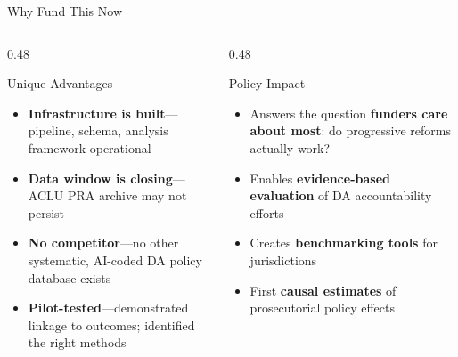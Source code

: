 \documentclass[aspectratio=169, 11pt]{beamer}
\begin{document}
\begin{frame}{Why Fund This Now}
\begin{columns}[T]
\begin{column}{0.48\textwidth}
\begin{block}{Unique Advantages}
\begin{itemize}\setlength\itemsep{3pt}
    \item \textbf{Infrastructure is built}---pipeline, schema, analysis framework operational
    \item \textbf{Data window is closing}---ACLU PRA archive may not persist
    \item \textbf{No competitor}---no other systematic, AI-coded DA policy database exists
    \item \textbf{Pilot-tested}---demonstrated linkage to outcomes; identified the right methods
\end{itemize}
\end{block}
\end{column}
\begin{column}{0.48\textwidth}
\begin{block}{Policy Impact}
\begin{itemize}\setlength\itemsep{3pt}
    \item Answers the question \textbf{funders care about most}: do progressive reforms actually work?
    \item Enables \textbf{evidence-based evaluation} of DA accountability efforts
    \item Creates \textbf{benchmarking tools} for jurisdictions
    \item First \textbf{causal estimates} of prosecutorial policy effects
\end{itemize}
\end{block}
\end{column}
\end{columns}
\end{frame}
\end{document}
